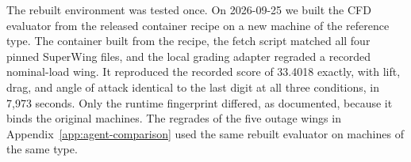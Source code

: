 \documentclass{article} %
\begin{document}
The rebuilt environment was tested once. On 2026-09-25 we built the CFD
evaluator from the released container recipe on a new machine of the reference
type. The container built from the recipe, the fetch script matched all four
pinned SuperWing files, and the local grading adapter regraded a recorded
nominal-load wing. It reproduced the recorded score of 33.4018 exactly, with
lift, drag, and angle of attack identical to the last digit at all three
conditions, in 7{,}973 seconds. Only the runtime fingerprint differed, as
documented, because it binds the original machines. The
regrades of the five outage wings in Appendix~\ref{app:agent-comparison} used
the same rebuilt evaluator on machines of the same type.








\clearpage

\end{document}
